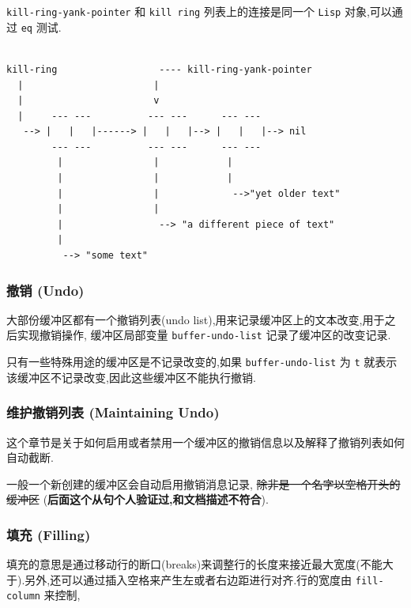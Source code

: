 \documentclass[11pt]{article}
\begin{document}
\begin{enumerate}
\texttt{kill-ring-yank-pointer} 和 \texttt{kill ring} 列表上的连接是同一个 \texttt{Lisp} 对象,可以通过 \texttt{eq} 测试.

\begin{verbatim}

kill-ring                  ---- kill-ring-yank-pointer
  |                       |
  |                       v
  |     --- ---          --- ---      --- ---
   --> |   |   |------> |   |   |--> |   |   |--> nil
        --- ---          --- ---      --- ---
         |                |            |
         |                |            |
         |                |             -->"yet older text"
         |                |
         |                 --> "a different piece of text"
         |
          --> "some text"

\end{verbatim}
\end{enumerate}


\subsubsection{撤销 (Undo)}
\label{sec:org496a305}

大部份缓冲区都有一个撤销列表(undo list),用来记录缓冲区上的文本改变,用于之后实现撤销操作, 缓冲区局部变量 \texttt{buffer-undo-list} 记录了缓冲区的改变记录.

只有一些特殊用途的缓冲区是不记录改变的,如果 \texttt{buffer-undo-list} 为 \texttt{t} 就表示该缓冲区不记录改变,因此这些缓冲区不能执行撤销.


\subsubsection{维护撤销列表 (Maintaining Undo)}
\label{sec:orge168df4}

这个章节是关于如何启用或者禁用一个缓冲区的撤销信息以及解释了撤销列表如何自动截断.

一般一个新创建的缓冲区会自动启用撤销消息记录, \sout{除非是一个名字以空格开头的缓冲区} (\textbf{后面这个从句个人验证过,和文档描述不符合}).


\subsubsection{填充 (Filling)}
\label{sec:org1d9b61c}

填充的意思是通过移动行的断口(breaks)来调整行的长度来接近最大宽度(不能大于).另外,还可以通过插入空格来产生左或者右边距进行对齐.行的宽度由 \texttt{fill-column} 来控制,
\end{document}

